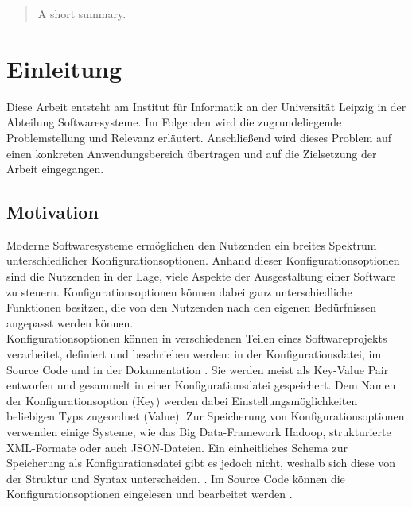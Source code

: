 \documentclass[german,bachelor]{swsLeipzig}
\begin{document}
\begin{frontmatter}
  \begin{abstract}
    A short summary.
  \end{abstract}

  \tableofcontents





\end{frontmatter}

\chapter{Einleitung}\label{Einleitung}
Diese Arbeit entsteht am Institut für Informatik an der Universit\"at Leipzig in der Abteilung \glqq Softwaresysteme\grqq.
Im Folgenden wird die zugrundeliegende Problemstellung und Relevanz erl\"autert.
Anschlie\ss end wird dieses Problem auf einen konkreten Anwendungsbereich \"ubertragen und auf die Zielsetzung der Arbeit eingegangen.\\

\section{Motivation}
Moderne Softwaresysteme erm\"oglichen den Nutzenden ein breites Spektrum unterschiedlicher Konfigurationsoptionen.
Anhand dieser Konfigurationsoptionen sind die Nutzenden in der Lage, viele Aspekte der Ausgestaltung einer Software zu steuern.
Konfigurationsoptionen k\"onnen dabei ganz unterschiedliche Funktionen besitzen, die von den Nutzenden nach den eigenen Bed\"urfnissen angepasst werden k\"onnen.\\

Konfigurationsoptionen können in verschiedenen Teilen eines Softwareprojekts verarbeitet, definiert und beschrieben werden:
in der Konfigurationsdatei, im Source Code und in der Dokumentation \cite[S. 185]{7774519}.
Sie werden meist als Key-Value Pair entworfen und gesammelt in einer Konfigurationsdatei gespeichert.
Dem Namen der Konfigurationsoption (Key) werden dabei Einstellungsmöglichkeiten beliebigen Typs zugeordnet (Value).
Zur Speicherung von Konfigurationsoptionen verwenden einige Systeme, wie das Big Data-Framework Hadoop, strukturierte XML-Formate oder auch JSON-Dateien.
Ein einheitliches Schema zur Speicherung als Konfigurationsdatei gibt es jedoch nicht, weshalb sich diese von der Struktur und Syntax unterscheiden. \cite[S. 131]{10.1145/1985793.1985812}.
Im Source Code können die Konfigurationsoptionen eingelesen und bearbeitet werden \cite[S. 185]{7774519}.\\
\end{document}

